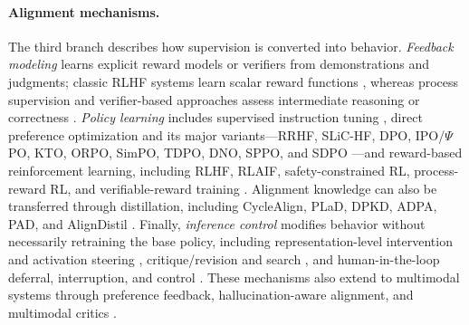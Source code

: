 \documentclass[10pt,a4paper,twocolumn]{article}
\begin{document}
\paragraph{Alignment mechanisms.}
The third branch describes how supervision is converted into behavior. \emph{Feedback modeling} learns explicit reward models or verifiers from demonstrations and judgments; classic RLHF systems learn scalar reward functions \citep{christiano2017preferences,stiennon2020summarize,ouyang2022instructgpt}, whereas process supervision and verifier-based approaches assess intermediate reasoning or correctness \citep{uesato2022process,lightman2024verify,wang2024mathshepherd,kirchner2024proververifier,song2025prmbench,zhang2026biprm}. \emph{Policy learning} includes supervised instruction tuning \citep{wei2022flan,sanh2022t0,wang2022superni,zhou2023lima}, direct preference optimization and its major variants---RRHF, SLiC-HF, DPO, IPO/$\Psi$PO, KTO, ORPO, SimPO, TDPO, DNO, SPPO, and SDPO \citep{yuan2023rrhf,zhao2023slichf,rafailov2023dpo,azar2023psipo,ethayarajh2024kto,hong2024orpo,meng2024simpo,zeng2024tdpo,rosset2024dno,wu2025sppo,kong2025sdpo}---and reward-based reinforcement learning, including RLHF, RLAIF, safety-constrained RL, process-reward RL, and verifiable-reward training \citep{christiano2017preferences,stiennon2020summarize,ouyang2022instructgpt,dai2024saferlhf,lee2024rlaif,shao2024deepseekmath,deepseek2025r1}. Alignment knowledge can also be transferred through distillation, including CycleAlign, PLaD, DPKD, ADPA, PAD, and AlignDistil \citep{hong2024cyclealign,zhang2024plad,li2024dpkd,gao2025adpa,gu2025pad,zhang2025aligndistil}. Finally, \emph{inference control} modifies behavior without necessarily retraining the base policy, including representation-level intervention and activation steering \citep{li2023iti,rimsky2024caa}, critique/revision and search \citep{madaan2023selfrefine,shinn2023reflexion,gou2024critic}, and human-in-the-loop deferral, interruption, and control \citep{mozannar2020defer,orseau2016interruptible,greenblatt2024control}. These mechanisms also extend to multimodal systems through preference feedback, hallucination-aware alignment, and multimodal critics \citep{yu2024rlhfv,li2024vlfeedback,guan2024hallusionbench,xiong2025llavacritic}.
\end{document}
